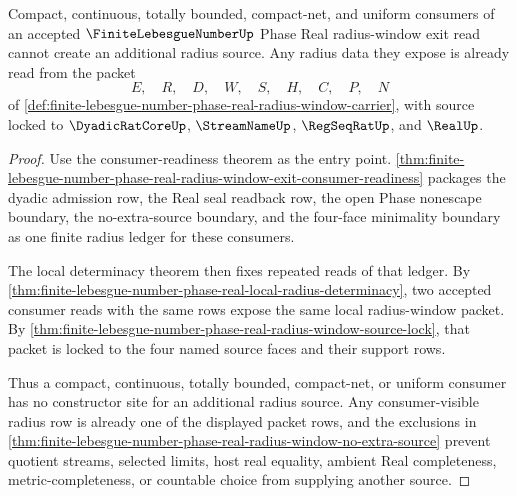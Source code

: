 \begin{theorem}
\label{thm:finite-lebesgue-number-phase-real-radius-consumer-nonescape}
Compact, continuous, totally bounded, compact-net, and uniform consumers of an accepted $\FiniteLebesgueNumberUp$ Phase Real radius-window exit read cannot create an additional radius source. Any radius data they expose is already read from the packet
$$
E,\quad R,\quad D,\quad W,\quad S,\quad H,\quad C,\quad P,\quad N
$$
of \autoref{def:finite-lebesgue-number-phase-real-radius-window-carrier}, with source locked to $\DyadicRatCoreUp$, $\StreamNameUp$, $\RegSeqRatUp$, and $\RealUp$.
\end{theorem}
\begin{proof}
Use the consumer-readiness theorem as the entry point. \autoref{thm:finite-lebesgue-number-phase-real-radius-window-exit-consumer-readiness} packages the dyadic admission row, the Real seal readback row, the open Phase nonescape boundary, the no-extra-source boundary, and the four-face minimality boundary as one finite radius ledger for these consumers.

The local determinacy theorem then fixes repeated reads of that ledger. By \autoref{thm:finite-lebesgue-number-phase-real-local-radius-determinacy}, two accepted consumer reads with the same rows expose the same local radius-window packet. By \autoref{thm:finite-lebesgue-number-phase-real-radius-window-source-lock}, that packet is locked to the four named source faces and their support rows.

Thus a compact, continuous, totally bounded, compact-net, or uniform consumer has no constructor site for an additional radius source. Any consumer-visible radius row is already one of the displayed packet rows, and the exclusions in \autoref{thm:finite-lebesgue-number-phase-real-radius-window-no-extra-source} prevent quotient streams, selected limits, host real equality, ambient Real completeness, metric-completeness, or countable choice from supplying another source.
\end{proof}
